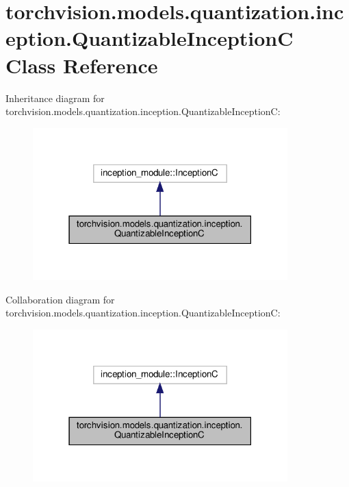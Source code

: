 \hypertarget{classtorchvision_1_1models_1_1quantization_1_1inception_1_1QuantizableInceptionC}{}\section{torchvision.\+models.\+quantization.\+inception.\+Quantizable\+InceptionC Class Reference}
\label{classtorchvision_1_1models_1_1quantization_1_1inception_1_1QuantizableInceptionC}


Inheritance diagram for torchvision.\+models.\+quantization.\+inception.\+Quantizable\+InceptionC\+:
\nopagebreak
\begin{figure}[H]
\begin{center}
\leavevmode
\includegraphics[width=279pt]{classtorchvision_1_1models_1_1quantization_1_1inception_1_1QuantizableInceptionC__inherit__graph}
\end{center}
\end{figure}


Collaboration diagram for torchvision.\+models.\+quantization.\+inception.\+Quantizable\+InceptionC\+:
\nopagebreak
\begin{figure}[H]
\begin{center}
\leavevmode
\includegraphics[width=279pt]{classtorchvision_1_1models_1_1quantization_1_1inception_1_1QuantizableInceptionC__coll__graph}
\end{center}
\end{figure}
